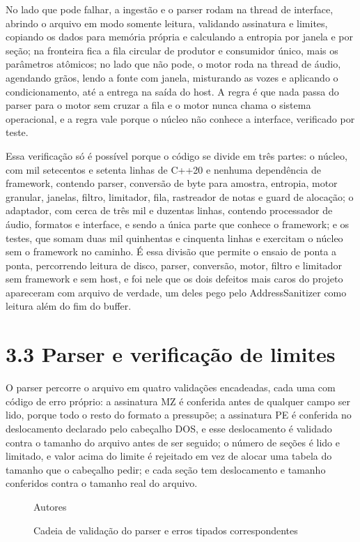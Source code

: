 \documentclass[11pt,a4paper]{article}
\begin{document}
No lado que pode falhar, a ingestão e o parser rodam na thread de interface, abrindo o arquivo em modo somente leitura, validando assinatura e limites, copiando os dados para memória própria e calculando a entropia por janela e por seção; na fronteira fica a fila circular de produtor e consumidor único, mais os parâmetros atômicos; no lado que não pode, o motor roda na thread de áudio, agendando grãos, lendo a fonte com janela, misturando as vozes e aplicando o condicionamento, até a entrega na saída do host. A regra é que nada passa do parser para o motor sem cruzar a fila e o motor nunca chama o sistema operacional, e a regra vale porque o núcleo não conhece a interface, verificado por teste.


Essa verificação só é possível porque o código se divide em três partes: o núcleo, com mil setecentos e setenta linhas de C++20 e nenhuma dependência de framework, contendo parser, conversão de byte para amostra, entropia, motor granular, janelas, filtro, limitador, fila, rastreador de notas e guard de alocação; o adaptador, com cerca de três mil e duzentas linhas, contendo processador de áudio, formatos e interface, e sendo a única parte que conhece o framework; e os testes, que somam duas mil quinhentas e cinquenta linhas e exercitam o núcleo sem o framework no caminho. É essa divisão que permite o ensaio de ponta a ponta, percorrendo leitura de disco, parser, conversão, motor, filtro e limitador sem framework e sem host, e foi nele que os dois defeitos mais caros do projeto apareceram com arquivo de verdade, um deles pego pelo AddressSanitizer como leitura além do fim do buffer.


\section*{3.3 Parser e verificação de limites}

O parser percorre o arquivo em quatro validações encadeadas, cada uma com código de erro próprio: a assinatura MZ é conferida antes de qualquer campo ser lido, porque todo o resto do formato a pressupõe; a assinatura PE é conferida no deslocamento declarado pelo cabeçalho DOS, e esse deslocamento é validado contra o tamanho do arquivo antes de ser seguido; o número de seções é lido e limitado, e valor acima do limite é rejeitado em vez de alocar uma tabela do tamanho que o cabeçalho pedir; e cada seção tem deslocamento e tamanho conferidos contra o tamanho real do arquivo.


\begin{figure}
\centering
\resizebox{0.92\textwidth}{!}{}
\caption{Cadeia de validação do parser e erros tipados correspondentes}
\label{fig:parser}
{\footnotesize Autores\par}
\end{figure}
\end{document}
